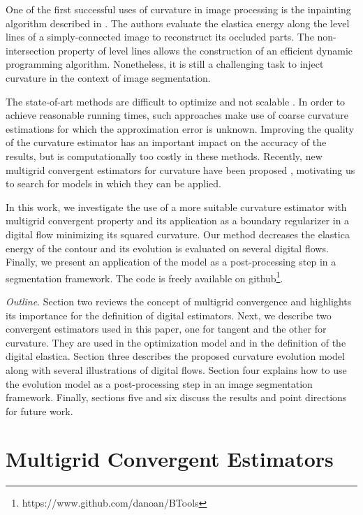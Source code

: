 \documentclass[runningheads]{llncs}
\begin{document}
One of the first successful uses of curvature in image processing is the inpainting algorithm described in
\cite{masnou98}. The authors evaluate the elastica energy along the level lines of a simply-connected image to
reconstruct its occluded parts. The non-intersection property of level lines allows the construction of an efficient
dynamic programming algorithm. Nonetheless, it is still a challenging task to inject curvature in the context of image
segmentation.

The state-of-art methods are difficult to optimize and not scalable \cite{zehiry10,schoenemann09,nieuwenhuis14}. In
order to achieve reasonable running times, such approaches make use of coarse curvature estimations for which the approximation
error is unknown. Improving the quality of the curvature estimator has an important impact on the accuracy of the
results, but is computationally too costly in these methods. Recently, new multigrid convergent estimators for curvature
have been proposed \cite{schindele17,coeurjolly13,roussillon11}, motivating us to search for models in which they can be
applied.

In this work, we investigate the use of a more suitable curvature estimator with multigrid convergent property and its
application as a boundary regularizer in a digital flow minimizing its squared curvature. Our method decreases the
elastica energy of the contour and its evolution is evaluated on several digital flows. Finally, we present an
application of the model as a post-processing step in a segmentation framework. The code is freely available on
github\footnote{https://www.github.com/danoan/BTools}.

\textit{Outline}. Section two reviews the concept of multigrid convergence and highlights its importance for the
definition of digital estimators. Next, we describe two convergent estimators used in this paper, one for tangent and
the other for curvature. They are used in the optimization model and in the definition of the digital elastica. Section
three describes the proposed curvature evolution model along with several illustrations of digital flows. Section four
explains how to use the evolution model as a post-processing step in an image segmentation framework. Finally, sections
five and six discuss the results and point directions for future work.




\section{Multigrid Convergent Estimators}
\end{document}
